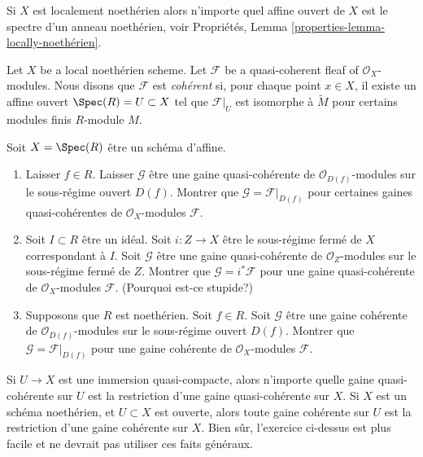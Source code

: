 \noindent
Si $X$ est localement noethérien alors n'importe quel
affine ouvert de $X$ est le
spectre d'un anneau noethérien, voir Propriétés, Lemma \ref{properties-lemma-locally-noethérien}.

\begin{definition}
\label{definition-coherent}
Let $X$ be a local noethérien
scheme. Let $\mathcal{F}$ be a quasi-coherent fleaf of
$\mathcal{O}_X$-modules. Nous disons que $\mathcal{F}$ est {\it cohérent} si, pour chaque
point $x \in X$, il existe un affine ouvert
$\Spec(R) = U \subset X$ tel que $\mathcal{F}|_U$
est isomorphe à $\widetilde M$ pour certains modules finis $R$-module $M$.
\end{definition}

\begin{exercise}
\label{exercise-extend-quasi-coherent}
Soit $X = \Spec(R)$ être un schéma d'affine.
\begin{enumerate}
\item Laisser $f \in R$.
Laisser $\mathcal{G}$ être une gaine quasi-cohérente de
$\mathcal{O}_{D(f)}$-modules sur le sous-régime
ouvert $D(f)$. Montrer que $\mathcal{G} =
\mathcal{F}|_{D(f)}$ pour certaines gaines quasi-cohérentes de
$\mathcal{O}_X$-modules $\mathcal{F}$.
\item Soit $I \subset R$ être
un idéal. Soit $i : Z \to X$ être
le sous-régime fermé de $X$
correspondant à $I$. Soit $\mathcal{G}$ être une
gaine quasi-cohérente de $\mathcal{O}_Z$-modules sur
le sous-régime fermé de $Z$. Montrer que
$\mathcal{G} = i^*\mathcal{F}$ pour une gaine quasi-cohérente de $\mathcal{O}_X$-modules $\mathcal{F}$.
(Pourquoi est-ce stupide?)
\item Supposons que $R$ est
noethérien. Soit $f \in R$.
Soit $\mathcal{G}$ être une gaine cohérente
de $\mathcal{O}_{D(f)}$-modules sur le
sous-régime ouvert $D(f)$. Montrer que $\mathcal{G} =
\mathcal{F}|_{D(f)}$ pour une gaine cohérente de $\mathcal{O}_X$-modules $\mathcal{F}$.
\end{enumerate}
\end{exercise}

\begin{remark}
\label{remark-extend-off-open}
Si $U \to X$ est une immersion quasi-compacte, alors
n'importe quelle gaine quasi-cohérente sur $U$ est la restriction d'une
gaine quasi-cohérente sur $X$. Si
$X$ est un schéma noethérien, et $U \subset X$ est ouverte,
alors toute gaine cohérente sur $U$ est la restriction d'une
gaine cohérente sur $X$.
Bien sûr, l'exercice ci-dessus est plus facile et ne devrait pas utiliser ces faits généraux.
\end{remark}
















